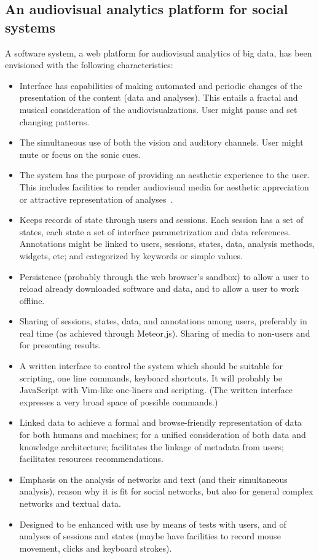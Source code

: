 \documentclass[letterpaper,10pt]{article}
\begin{document}
\subsection{An audiovisual analytics platform for social systems}\label{sys}
A software system, a web platform for audiovisual analytics of big data,
has been envisioned with the following characteristics:
\begin{itemize}
  \item Interface has capabilities of making automated and periodic changes of
	  the presentation of the content (data and analyses).
		This entails a fractal and musical consideration
		of the audiovisualzations.
		User might pause and set changing patterns.
  \item The simultaneous use of both the vision and auditory channels.
	  User might mute or focus on the sonic cues.
  \item The system has the purpose of providing an aesthetic experience
	  to the user.
		This includes facilities to render audiovisual media
		for aesthetic appreciation or attractive representation of
		analyses~\cite{tufte}.
  \item Keeps records of state through users and sessions.
	  Each session has a set of states, each state a set
		of interface parametrization and data references.
	Annotations might be linked to users, sessions, states, data,
		analysis methods, widgets, etc; and categorized
		by keywords or simple values.
  \item Persistence (probably through the web browser's sandbox)
	  to allow a user to reload already downloaded software
		and data,
		and to allow a user to work offline.
  \item Sharing of sessions, states, data, and annotations among users,
	  preferably in real time (as achieved through Meteor.js).
		Sharing of media to non-users and for presenting results.
  \item A written interface to control the system which should be
	  suitable for scripting, one line commands, keyboard shortcuts.
		It will probably be JavaScript with Vim-like one-liners and scripting.
		(The written interface expresses a very broad space
		of possible commands.)
  \item Linked data to achieve a formal and browse-friendly representation of data for both humans and machines;
	  for a unified consideration of both data and knowledge architecture;
facilitates the linkage of metadata from users;
facilitates resources recommendations.
  \item Emphasis on the analysis of networks and text (and their simultaneous analysis),
	  reason why it is fit for social networks, but also for general complex networks
		and textual data.
  \item Designed to be enhanced with use by means of tests with users,
	  and of analyses of sessions and states
	  (maybe have facilities to record mouse movement, clicks and keyboard strokes).
\end{itemize}
\end{document}
